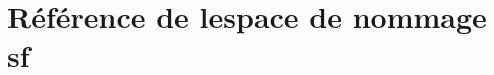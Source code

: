 \hypertarget{namespacesf}{}\section{Référence de l\textquotesingle{}espace de nommage sf}
\label{namespacesf}
